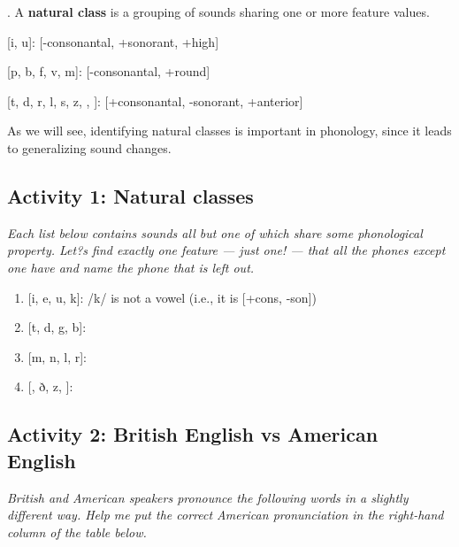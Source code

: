 \documentclass[11pt, oneside]{article}   	%
\begin{document}
\ex. A {\bfseries natural class} is a grouping of sounds sharing one or more feature values. 
\begin{description}
\item {[}i, u]: [-consonantal, +sonorant, +high] 
\item {[}p, b, f, v, m]: [-consonantal, +round] 
\item {[}t, d, r, l, s, z, \textglotstop, \dh]: [+consonantal, -sonorant, +anterior] 
\end{description}
As we will see, identifying natural classes is important in phonology, since it leads to generalizing sound changes.

\subsection{Activity 1: Natural classes} 

{\itshape Each list below contains sounds all but one of which share some phonological property. Let?s find exactly one feature --- just one! --- that all the phones except one have and name the phone that is left out.}

\begin{enumerate}
\item {[i, e, u, k]}: /k/ is not a vowel (i.e., it is [+cons, -son])
\item {[t, d, g, b]}:
\item {[m, n, l, r]}:
\item {[, ð, z, ]}:
\end{enumerate}

\subsection{Activity 2: British English vs American English}

{\itshape British and American speakers pronounce the following words in a slightly different way. Help me put the correct American pronunciation in the right-hand column of the table below.}
\end{document}
